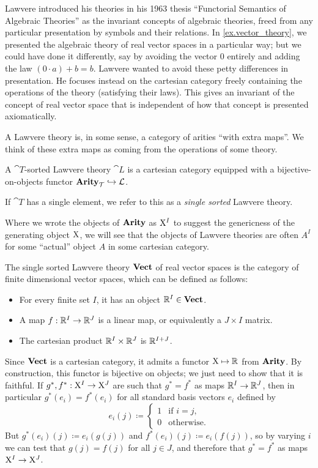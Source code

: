\documentclass[DynamicalBook]{subfiles}
\begin{document}
Lawvere introduced his theories in his 1963 thesis ``Functorial Semantics of
Algebraic Theories'' \cite{Lawvere:Functorial.Semantics} as the invariant concepts of algebraic theories,
freed from any particular presentation by symbols and their relations. In
\cref{ex.vector_theory}, we presented the algebraic theory of real vector spaces
in a particular way; but we could have done it differently, say by avoiding the
vector $0$
entirely and adding the law $(0 \cdot a) + b = b$. Lawvere wanted to avoid these
petty differences in presentation. He focuses
instead on the cartesian category freely
containing the operations of the theory (satisfying their laws). This gives an invariant
of the concept of real vector space that is independent of how that concept is presented axiomatically.

A Lawvere theory is, in some sense, a category of arities ``with extra maps''.
We think of these extra maps as coming from the operations of some theory.
\begin{definition}
A $\cat{T}$-sorted Lawvere theory $\cat{L}$ is a cartesian category equipped with a bijective-on-objects functor $\textbf{Arity}_{\mathcal{T}} \hookrightarrow
\mathcal{L}$. 

If $\cat{T}$ has a single element, we refer to this as a \emph{single sorted}
Lawvere theory.
\end{definition}

Where we wrote the objects of $\textbf{Arity}$ as $\mathrm{X}^I$ to suggest the genericness of
the generating object $\mathrm{X}$, we will see that the objects
of Lawvere theories are often $A^I$ for some ``actual'' object $A$ in some
cartesian category.
\begin{example}
  The single sorted Lawvere theory $\textbf{Vect}$ of real vector spaces is the category of finite dimensional vector spaces, which can be defined as follows:
  \begin{itemize}
    \item For every finite set $I$, it has an object $\mathbb{R}^I \in \textbf{Vect}$.
    \item A map $f : \mathbb{R}^I \to \mathbb{R}^J$ is a linear map, or equivalently a $J
      \times I$ matrix.
    \item The cartesian product $\mathbb{R}^I \times \mathbb{R}^J$ is $\mathbb{R}^{I + J}$.
 \end{itemize}

 Since $\textbf{Vect}$ is a cartesian category, it admits a functor $\mathrm{X} \mapsto
 \mathbb{R}$ from $\textbf{Arity}$. By construction, this functor is bijective on objects; we
 just need to show that it is faithful. If $g^{\ast}, f^{\ast} : \mathrm{X}^I \to
 \mathrm{X}^J$ are such that $g^{\ast} = f^{\ast}$ as maps $\mathbb{R}^I \to \mathbb{R}^J$, then in
 particular $g^{\ast}(e_i) =f^{\ast}(e_i)$ for all standard basis vectors $e_i$
 defined by
\[
e_i(j) \coloneqq \begin{cases} 1 &\mbox{if $i = j$,} \\0 &\mbox{otherwise.} \end{cases}
\]
But $g^{\ast}(e_i)(j) \coloneqq e_i(g(j))$ and $f^{\ast}(e_i)(j) \coloneqq
e_i(f(j))$, so by varying $i$ we can test that $g(j) = f(j)$ for all $j \in J$,
and therefore that $g^{\ast} = f^{\ast}$ as maps $\mathrm{X}^I \to \mathrm{X}^J$.
\end{example}
\end{document}
